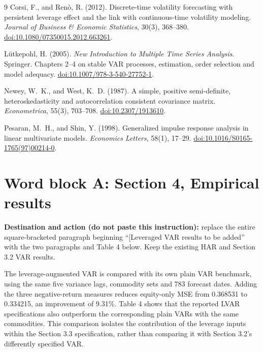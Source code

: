 \documentclass[11pt,a4paper]{article}
\begin{document}
\clearpage
\begin{thebibliography}{9}
Corsi, F., and Ren\`o, R. (2012). Discrete-time volatility forecasting with persistent leverage effect and the link with continuous-time volatility modeling. \emph{Journal of Business \& Economic Statistics}, 30(3), 368--380. \href{https://doi.org/10.1080/07350015.2012.663261}{doi:10.1080/07350015.2012.663261}.

L\"utkepohl, H. (2005). \emph{New Introduction to Multiple Time Series Analysis}. Springer. Chapters 2--4 on stable VAR processes, estimation, order selection and model adequacy. \href{https://doi.org/10.1007/978-3-540-27752-1}{doi:10.1007/978-3-540-27752-1}.

Newey, W.~K., and West, K.~D. (1987). A simple, positive semi-definite, heteroskedasticity and autocorrelation consistent covariance matrix. \emph{Econometrica}, 55(3), 703--708. \href{https://doi.org/10.2307/1913610}{doi:10.2307/1913610}.


Pesaran, M.~H., and Shin, Y. (1998). Generalized impulse response analysis in linear multivariate models. \emph{Economics Letters}, 58(1), 17--29. \href{https://doi.org/10.1016/S0165-1765(97)00214-0}{doi:10.1016/S0165-1765(97)00214-0}.

\end{thebibliography}

\clearpage
\renewcommand{\thetable}{\arabic{table}}
\section*{Word block A: Section 4, Empirical results}

\textbf{Destination and action (do not paste this instruction):} replace the entire square-bracketed paragraph beginning ``[Leveraged VAR results to be added'' with the two paragraphs and Table 4 below. Keep the existing HAR and Section 3.2 VAR results.

The leverage-augmented VAR is compared with its own plain VAR benchmark, using the same five variance lags, commodity sets and 783 forecast dates. Adding the three negative-return measures reduces equity-only MSE from 0.368531 to 0.334215, an improvement of 9.31\%. Table 4 shows that the reported LVAR specifications also outperform the corresponding plain VARs with the same commodities. This comparison isolates the contribution of the leverage inputs within the Section 3.3 specification, rather than comparing it with Section 3.2's differently specified VAR.
\end{document}
